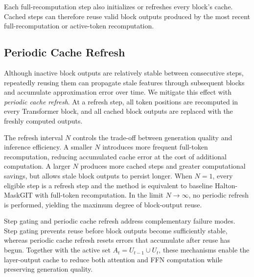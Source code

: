 Each full-recomputation step also initializes or refreshes every block's cache. Cached steps can therefore reuse valid block outputs produced by the most recent full-recomputation or active-token recomputation.

\subsection{Periodic Cache Refresh}
\label{sec:refresh}

Although inactive block outputs are relatively stable between consecutive steps, repeatedly reusing them can propagate stale features through subsequent blocks and accumulate approximation error over time. We mitigate this effect with \emph{periodic cache refresh}. At a refresh step, all token positions are recomputed in every Transformer block, and all cached block outputs are replaced with the freshly computed outputs.

The refresh interval $N$ controls the trade-off between generation quality and inference efficiency. A smaller $N$ introduces more frequent full-token recomputation, reducing accumulated cache error at the cost of additional computation. A larger $N$ produces more cached steps and greater computational savings, but allows stale block outputs to persist longer. When $N=1$, every eligible step is a refresh step and the method is equivalent to baseline Halton-MaskGIT with full-token recomputation. In the limit $N\to\infty$, no periodic refresh is performed, yielding the maximum degree of block-output reuse.

Step gating and periodic cache refresh address complementary failure modes. Step gating prevents reuse before block outputs become sufficiently stable, whereas periodic cache refresh resets errors that accumulate after reuse has begun. Together with the active set $A_t=U_{t-1}\cup U_t$, these mechanisms enable the layer-output cache to reduce both attention and FFN computation while preserving generation quality.
